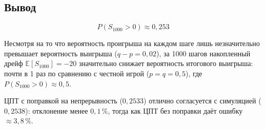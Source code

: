 \documentclass[a4paper,14pt]{article}
\begin{document}
\subsection*{Вывод}

\[
    \boxed{P(S_{1000} > 0) \approx 0{,}253}
\]

Несмотря на то что вероятность проигрыша на каждом шаге лишь незначительно превышает вероятность выигрыша ($q - p = 0{,}02$), за 1000 шагов накопленный дрейф $\mathbb{E}[S_{1000}] = -20$ значительно снижает вероятность итогового выигрыша: почти в 1 раз по сравнению с честной игрой ($p = q = 0{,}5$), где $P(S_{1000} > 0) \approx 0{,}5$.

ЦПТ с поправкой на непрерывность ($0{,}2533$) отлично согласуется с симуляцией ($0{,}2538$): отклонение менее $0{,}1\,\%$, тогда как ЦПТ без поправки даёт ошибку $\approx 3{,}8\,\%$.
\end{document}
